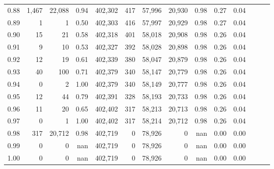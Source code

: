 \begin{tabular}{rrrrrrrrrrrrrr}
0.88 &   1,467 &  22,088 &  0.94 &  402,302 &      417 &  57,996 &  20,930 &  0.98 &  0.27 &      0.04 \\
0.89 &       1 &       1 &  0.50 &  402,303 &      416 &  57,997 &  20,929 &  0.98 &  0.27 &      0.04 \\
0.90 &      15 &      21 &  0.58 &  402,318 &      401 &  58,018 &  20,908 &  0.98 &  0.26 &      0.04 \\
0.91 &       9 &      10 &  0.53 &  402,327 &      392 &  58,028 &  20,898 &  0.98 &  0.26 &      0.04 \\
0.92 &      12 &      19 &  0.61 &  402,339 &      380 &  58,047 &  20,879 &  0.98 &  0.26 &      0.04 \\
0.93 &      40 &     100 &  0.71 &  402,379 &      340 &  58,147 &  20,779 &  0.98 &  0.26 &      0.04 \\
0.94 &       0 &       2 &  1.00 &  402,379 &      340 &  58,149 &  20,777 &  0.98 &  0.26 &      0.04 \\
0.95 &      12 &      44 &  0.79 &  402,391 &      328 &  58,193 &  20,733 &  0.98 &  0.26 &      0.04 \\
0.96 &      11 &      20 &  0.65 &  402,402 &      317 &  58,213 &  20,713 &  0.98 &  0.26 &      0.04 \\
0.97 &       0 &       1 &  1.00 &  402,402 &      317 &  58,214 &  20,712 &  0.98 &  0.26 &      0.04 \\
0.98 &     317 &  20,712 &  0.98 &  402,719 &        0 &  78,926 &       0 &   nan &  0.00 &      0.00 \\
0.99 &       0 &       0 &   nan &  402,719 &        0 &  78,926 &       0 &   nan &  0.00 &      0.00 \\
1.00 &       0 &       0 &   nan &  402,719 &        0 &  78,926 &       0 &   nan &  0.00 &      0.00 \\
\bottomrule
\end{tabular}
